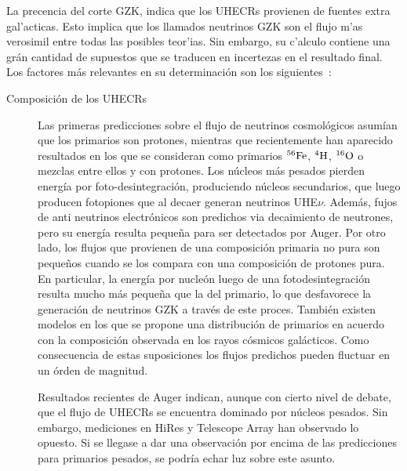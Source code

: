 	La precencia del corte GZK, indica que los UHECRs provienen de fuentes extra gal'acticas.
	Esto implica que los llamados neutrinos GZK son el flujo m'as verosimil entre todas las posibles teor'ias. 
	Sin embargo, su c'alculo contiene una gr\'an cantidad de supuestos que se traducen en incertezas en el resultado final.
	Los factores m\'as relevantes en su determinaci\'on son los siguientes~\cite{cite:nuEngel,cite:nuAve,cite:nuAhlers1,cite:nuAllard1,cite:nuYuksel}:
	
	\begin{description}
	\item[Composici\'on de los UHECRs] Las primeras predicciones sobre el flujo de neutrinos cosmol\'ogicos asum\'ian que los primarios son protones, mientras que recientemente han aparecido resultados en los que se consideran como primarios $^{56}{\rm Fe}$, $^{4}{\rm H}$, $^{16}{\rm O}$ o mezclas entre ellos y con protones\cite{cite:nuAve,cite:nuHooper}.
	Los n\'ucleos m\'as pesados pierden energ\'ia por foto-desintegraci\'on, produciendo n\'ucleos secundarios, que luego producen fotopiones que al decaer generan neutrinos UHE$\nu$.
	Adem\'as, fujos de anti neutrinos electr\'onicos son predichos via decaimiento de neutrones\cite{cite:nuFeComposition}, pero su energ\'ia resulta peque\~na para ser detectados por Auger.
	Por otro lado, los flujos que provienen de una composici\'on primaria no pura son peque\~nos cuando se los compara con una composici\'on de protones pura\cite{cite:nuHooper}.
	En particular, la energ\'ia por nucle\'on luego de una fotodesintegraci\'on resulta mucho m\'as peque\~na que la del primario, lo que desfavorece la generaci\'on de neutrinos GZK a trav\'es de este proces.
	Tambi\'en existen modelos en los que se propone una distribuci\'on de primarios en acuerdo con la composici\'on observada en los rayos c\'osmicos gal\'acticos\cite{cite:nuAllard1}.
	Como consecuencia de estas suposiciones los flujos predichos pueden fluctuar en un \'orden de magnitud.
	 
	Resultados recientes de Auger indican, aunque con cierto nivel de debate, que el flujo de UHECRs se encuentra dominado por n\'ucleos pesados\cite{cite:augerComposition}.
	Sin embargo, mediciones en HiRes y Telescope Array\cite{cite:taComposition} han observado lo opuesto.
	Si se llegase a dar una observaci\'on por encima de las predicciones para primarios pesados, se podr\'ia echar luz sobre este asunto.
	 

\end{description}
